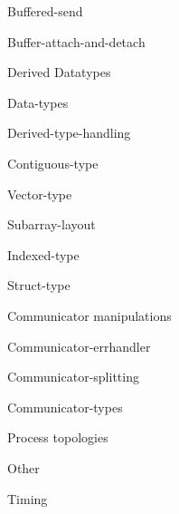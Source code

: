 \documentclass[11pt,headernav]{beamer}
\begin{document}
\begin{frame}[containsverbatim]{Buffered-send}
  
\end{frame}
\begin{frame}[containsverbatim]{Buffer-attach-and-detach}
  
\end{frame}

 {Derived Datatypes}

\begin{frame}[containsverbatim]{Data-types}
  
\end{frame}
\begin{frame}[containsverbatim]{Derived-type-handling}
  
\end{frame}
\begin{frame}[containsverbatim]{Contiguous-type}
  
\end{frame}
\begin{frame}[containsverbatim]{Vector-type}
  
\end{frame}
\begin{frame}[containsverbatim]{Subarray-layout}
  
\end{frame}
\begin{frame}[containsverbatim]{Indexed-type}
  
\end{frame}
\begin{frame}[containsverbatim]{Struct-type}
  
\end{frame}

 {Communicator manipulations}

\begin{frame}[containsverbatim]{Communicator-errhandler}
  
\end{frame}
\begin{frame}[containsverbatim]{Communicator-splitting}
  
\end{frame}
\begin{frame}[containsverbatim]{Communicator-types}
  
\end{frame}

 {Process topologies}

 {Other}

\begin{frame}[containsverbatim]{Timing}
  
\end{frame}
\end{document}
